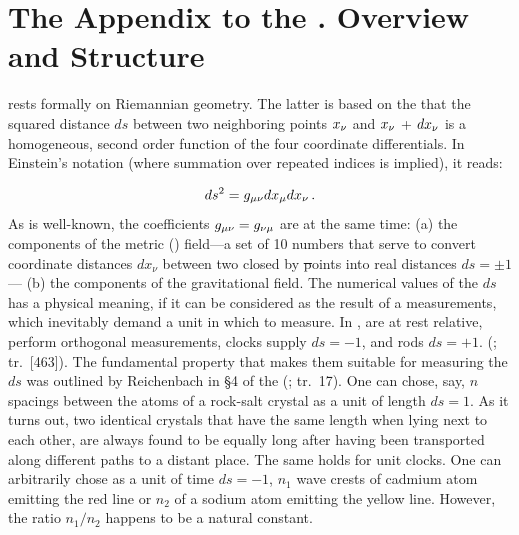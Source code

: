 \documentclass[submitted]{article}
\newcommand{\xadx}{$\xn$ and $\xn$ + $d\xn$\xspace}
\newcommand{\PRZL}{\citetitle{Reichenbach1928}\xspace}
\renewcommand{\rzlp}[2]{(\cite[#1]{Reichenbach1928}; tr.\ #2)\xspace}
\renewcommand{\rzlap}[2]{(\cite[#1]{Reichenbach1928}; tr.\ [#2])\xspace}
\begin{document}
\section{The Appendix to the \PRZL. Overview and Structure}
\label{overview}

\Gr rests formally on Riemannian geometry. The latter is based on the  that the squared distance $ds$ between two neighboring points \xadx is a homogeneous, second order function of the four coordinate differentials. In Einstein's notation (where summation over repeated indices is implied), it reads:

\begin{equation}\label{eq:lineelement}
ds^2=g_{\mu\nu} dx_\mu dx_\nu\,.
\end{equation}
%
As is well-known, the coefficients $g_{\mu\nu}=g_{\nu\mu}$ are at the same time: (a) the components of the metric () field---a set of 10 numbers that serve to convert coordinate distances $dx_\nu$ between two closed by \st points into real distances $ds=\pm 1$--- (b) the components of the gravitational field. The numerical values of the $ds$ has a physical meaning, if it can be considered as the result of a measurements, which inevitably demand a unit in which to measure. In \rt, \rac are at rest relative, perform orthogonal measurements, clocks supply $d s=-1$, and rods $d s=+1$. \rzlap{331}{463}. The fundamental property that makes them suitable for measuring the $ds$ was outlined by Reichenbach in \S4 of the \PRZL \rzlp{26--27}{17}. One can chose, say, $n$ spacings between the atoms of a rock-salt crystal as a unit of length $ds=1$. As it turns out, two identical crystals that have the same length when lying next to each other, are always found to be equally long after having been transported along different paths to a distant place. The same holds for unit clocks. One can arbitrarily chose as a unit of time $ds=-1$, $n_1$ wave crests of cadmium atom emitting the red line or $n_2$ of a sodium atom emitting the yellow line. However, the ratio $n_1/n_2$ happens to be a natural constant.
\end{document}
